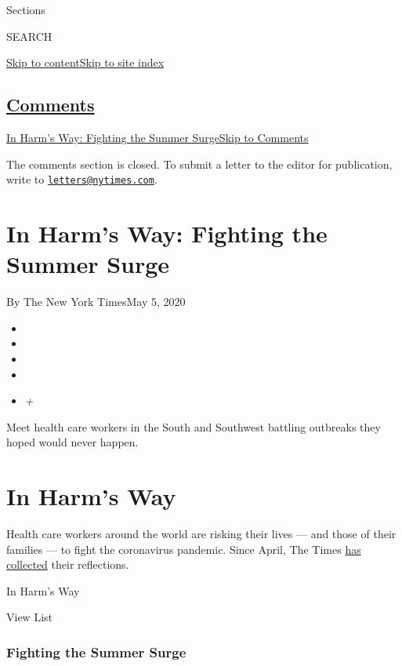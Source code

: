 Sections

SEARCH

\protect\hyperlink{site-content}{Skip to
content}\protect\hyperlink{site-index}{Skip to site index}

\hypertarget{comments}{%
\subsection{\texorpdfstring{\protect\hyperlink{commentsContainer}{Comments}}{Comments}}\label{comments}}

\href{}{In Harm's Way: Fighting the Summer Surge}\href{}{Skip to
Comments}

The comments section is closed. To submit a letter to the editor for
publication, write to
\href{mailto:letters@nytimes.com}{\nolinkurl{letters@nytimes.com}}.

\hypertarget{in-harms-way-fighting-the-summer-surge}{%
\section{In Harm's Way: Fighting the Summer
Surge}\label{in-harms-way-fighting-the-summer-surge}}

By The New York TimesMay 5, 2020

\begin{itemize}
\item
\item
\item
\item
\item
  \emph{+}
\end{itemize}

Meet health care workers in the South and Southwest battling outbreaks
they hoped would never happen.

\hypertarget{in-harms-way}{%
\section{In Harm's Way}\label{in-harms-way}}

Health care workers around the world are risking their lives --- and
those of their families --- to fight the coronavirus pandemic. Since
April, The Times
\href{https://www.nytimes.com/article/doctors-treating-coronavirus.html}{has
collected} their reflections.

In Harm's Way

View List

\hypertarget{fighting-the-summer-surge}{%
\subsubsection{Fighting the Summer
Surge}\label{fighting-the-summer-surge}}

